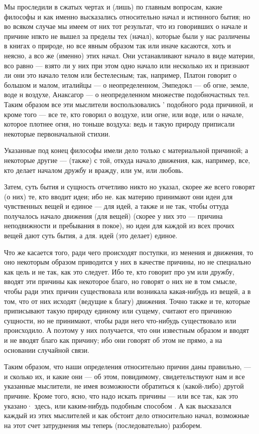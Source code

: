 \documentclass{article}
\begin{document}
Мы проследили в сжатых чертах и (лишь) по главным вопросам, какие философы и как именно высказались относительно начал и истинного бытия; но во всяком случае мы имеем от них тот результат, что из говоривших о начале и причине нпкто не вышел за пределы тех (начал), которые были у нас различены в книгах о природе,
\footnotemark[1]
но все явным образом так или иначе касаются, хоть и неясно, а всо же (именно) этих начал. Они устанавливают начало в виде материи, всо равно --- взято ли у них при этом одно начало или несколько их и признают ли они это начало телом или бестелесным; так, например, Платон говорит о большом и малом, италийцы --- о неопределенном, Эмпедокл --- об огне, земле, воде н воздухе, Анаксагор --- о неопределенном множестве подобночастных тел. Таким образом все эти мыслители воспользовались ' подобного рода причиной, и кроме того --- все те, кто говорил о воздухе, или огне, или воде, или о начале, которое плотнее огня, но тоньше воздуха:
\footnotemark[2]
ведь и такую природу приписали некоторые первоначальной стихии.

Указанные под конец философы имели дело только с материальной причиной; а некоторые другие --- (также) с той, откуда начало движения, как, например, все, кто делает началом дружбу и вражду, или ум, или любовь.

Затем, суть бытия и сущность отчетливо никто но указал, скорее же всего говорят (о них) те, кто вводит идеи; ибо не. как материю принимают они идеи для чувственных вещей и единое --- для идей, а также и не так, чтобы оттуда получалось начало движения (для вещей) (скорее у них это --- причина неподвижности и пребывания в покое), но идеи для каждой из всех прочих вещей дают суть бытия, а для. идей (это делает) единое.

Что же касается того, ради чего происходят поступки, из менения и движения, то оно некоторым образом приводится у них в качестве причины, но не специально как цель и не так, как это следует. Ибо те, кто говорит про ум или дружбу, вводят эти причины как некоторое благо, но говорят о них не в том смысле, чтобы ради этих причин существовала или возникала какая-нибудь из вещей, а в том, что от них исходят (ведущие к благу) движения. Точно также и те, которые приписывают такую природу единому или сущему,
\footnotemark[4]
считают его причиною сущности, но не принимают, чтобы ради него что-нибудь существовало или происходило. А поэтому у них получается, что они
\footnotemark[5]
известным образом и вводят и не вводят благо как причину; ибо они говорят об этом не прямо, а на основании случайной связи.

Таким образом, что наши определения относительно причин даны правильно, --- и сколько их, и какие они --- об этом, повидимому, свидетельствуют нам и все указанные мыслители, не имея возможности обратиться к (какой-либо) другой причине. Кроме того, ясно, что надо искать причины --- или все так, как это указано· здесь, или каким-нибудь подобным способом . А как высказался каждый из этих мыслителей и как обстоит дело относительно начал, возможные на этот счет затруднения мы теперь (последовательно) разборем.
\end{document}
